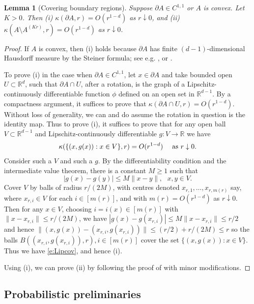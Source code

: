 \documentclass[12pt]{article}
\newcommand{\R}{\mathbb{R}}
\newtheorem{lemm}{Lemma}
\begin{document}
\begin{lemm}[Covering boundary regions]
	\label{l:Covbdy}
	Suppose $\partial A \in C^{1,1}$ or $A$ is convex. Let $K >0$.
	Then 
	(i) $\kappa(\partial A,r) = O(r^{1-d})$ as $r \downarrow 0$, and
	(ii) $\kappa(A \setminus A^{(Kr)},r) = O(r^{1-d})$ as $r \downarrow 0$.
\end{lemm}
\begin{proof}
	If $A$ is convex, then (i) holds because
	 $\partial A$ has finite $(d-1)$-dimensional Hausdorff measure
	by the Steiner formula; see e.g. \cite{CSKM}, or 
	\cite[eq. (A.23)]{LP}.

	To prove (i) in the case when $\partial A \in C^{1,1}$,
	let $x \in \partial A$ and take bounded open $U \subset \R^{d}$,
	such that $\partial A \cap U$, after a rotation, is the graph
	of a Lipschitz-continuously differentiable function $\phi$ defined
	on an open set in $\R^{d-1}$. By a compactness argument, 
	it suffices to prove that $\kappa(\partial A \cap U,r) = O(r^{1-d})$.
	Without loss of generality, we can and do assume the rotation
	in question is the identity map. Thus to prove (i),
	it suffices  to prove that
	for any  open ball $V \subset \R^{d-1}$
	and Lipschitz-continuously differentiable
	$g:V \to \R$ we have
	\begin{align}
		\kappa (\{(x,g(x)): x \in V \},r) = O(r^{1-d})~~~~ {\rm as}~ r
		\downarrow 0.
		\label{e:Lipcov}
	\end{align}
	Consider such a $V$ and such a $g$.
	By the differentiability condition
 and the intermediate
	value theorem, there is a constant $M \geq 1$
	such that %
	$$
	|g(x) - g(y)| \leq M \|x-y\|, ~~~ x,y \in V.
	$$
	Cover $V$ by %
	balls of radius $r/(2M)$,
	with centres denoted $x_{r,1},\ldots,x_{r,m(r)}$ say,
	where $x_{r,i} \in V$ for each $i \in [m(r)]$, and
	with $m(r) = O(r^{1-d})$ as $r \downarrow 0$. 
	Then for any $x \in V$, choosing $i = i(x) \in [m(r)]$
	with $\|x- x_{r,i}\| \leq r/(2M)$, we have %
	$|g(x) -g(x_{r,i}) | \leq M\|x-x_{r,i}\| \leq r/2$ and hence
	$\|(x,g(x))- (x_{r,i},g(x_{r,i})) \| \leq (r/2) + r/(2M) \leq r$ 
	so the balls $B((x_{r,i},g(x_{r,i})),r), i \in [m(r)]$ 
	cover the set $\{(x,g(x)):x \in V\}$. Thus we have
	\eqref{e:Lipcov}, and hence (i).

	Using (i),  we can prove (ii)
	by following
	the proof of \cite[eq. (6.17)]{MPCov} with minor modifications.
\end{proof}
	\subsection{Probabilistic preliminaries}
\end{document}
